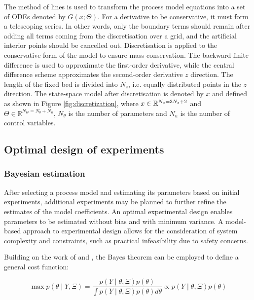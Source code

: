 \documentclass[a4paper,fleqn]{cas-dc}
\begin{document}
		The method of lines is used to transform the process model equations into a set of ODEs denoted by $G(x;\Theta)$. For a derivative to be conservative, it must form a telescoping series. In other words, only the boundary terms should remain after adding all terms coming from the discretisation over a grid, and the artificial interior points should be cancelled out. Discretisation is applied to the conservative form of the model to ensure mass conservation. The backward finite difference is used to approximate the first-order derivative, while the central difference scheme approximates the second-order derivative $z$ direction. The length of the fixed bed is divided into $N_z$, i.e. equally distributed points in the $z$ direction. The state-space model after discretisation is denoted by $x$ and defined as shown in Figure \ref{fig:discretization}, where ${\color{black}x} \in \mathbb{R}^{N_x = 3N_z+2} $ and $\Theta \in \mathbb{R}^{N_\Theta =  N_{\theta} + N_u } $, $N_{\theta}$ is the number of parameters and $N_{u}$ is the number of control variables.
		
		\subsection{Optimal design of experiments} \label{CH: DOE}
		\subsubsection{Bayesian estimation}
		
		After selecting a process model and estimating its parameters based on initial experiments, additional experiments may be planned to further refine the estimates of the model coefficients. An optimal experimental design enables parameters to be estimated without bias and with minimum variance. A model-based approach to experimental design allows for the consideration of system complexity and constraints, such as practical infeasibility due to safety concerns.
		
		Building on the work of \citet{Walter2010} and \citet{Himmelblau1970}, the Bayes theorem can be employed to define a general cost function:
		
		{\footnotesize
			\begin{equation}
				\max p\left(\theta \mid Y, \Xi \right) = \frac{p\left(Y \mid \theta, \Xi\right) p\left(\theta\right)}{\int p\left(Y \mid \theta, \Xi\right) p\left(\theta\right) d\theta} \propto p\left(Y \mid \theta, \Xi\right) p\left(\theta\right)
			\end{equation}
		}
		
\end{document}
